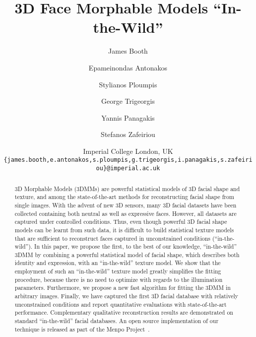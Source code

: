 \documentclass[10pt,twocolumn,letterpaper]{article}
\begin{document}
%
\title{3D Face Morphable Models ``In-the-Wild''}
\author{James Booth
\and
Epameinondas Antonakos
\and
Stylianos  Ploumpis
\and
George  Trigeorgis
\and
Yannis  Panagakis
\and
Stefanos Zafeiriou
\and
Imperial College London, UK
\\
{\tt\small \{james.booth,e.antonakos,s.ploumpis,g.trigeorgis,i.panagakis,s.zafeiriou\}@imperial.ac.uk}
}

\maketitle
%

%
\begin{abstract}
3D Morphable Models (3DMMs) are powerful statistical models of 3D facial shape and texture, and among the state-of-the-art methods for reconstructing facial shape from single images.
With the advent of new 3D sensors, many 3D facial datasets have been collected containing both neutral as well as expressive faces.
However, all datasets are captured under controlled conditions.
Thus, even though powerful 3D facial shape models can be learnt from such data, it is difficult to build statistical texture models that are sufficient to reconstruct faces captured in unconstrained conditions (``in-the-wild'').
In this paper, we propose the first, to the best of our knowledge, ``in-the-wild'' 3DMM by combining a powerful statistical model of facial shape, which describes both identity and expression, with an ``in-the-wild'' texture model.
We show that the employment of such an ``in-the-wild'' texture model greatly simplifies the fitting procedure, because there is no need to optimize with regards to the illumination parameters.
Furthermore, we propose a new fast algorithm for fitting the 3DMM in arbitrary images.
Finally, we have captured the first 3D facial database with relatively unconstrained conditions and report quantitative evaluations with state-of-the-art performance.
Complementary qualitative reconstruction results are demonstrated on standard ``in-the-wild'' facial databases.
An open source implementation of our technique is released as part of the Menpo Project~\cite{menpo14}.
\end{abstract}

%








{\small


}
\end{document}

